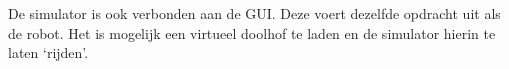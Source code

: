 \documentclass[tt3]{penoverslag}
\begin{document}
De simulator is ook verbonden aan de GUI. Deze voert dezelfde opdracht uit als de robot. Het is mogelijk een virtueel doolhof te laden en de simulator hierin te laten `rijden'.


\newpage
\makeappendix

%
%
%
%
\end{document}
